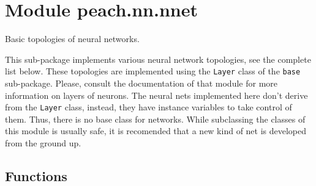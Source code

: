 %
%
%


\section{Module peach.nn.nnet}

    \label{peach:nn:nnet}

Basic topologies of neural networks.

This sub-package implements various neural network topologies, see the complete
list below. These topologies are implemented using the \texttt{Layer} class of the
\texttt{base} sub-package. Please, consult the documentation of that module for more
information on layers of neurons. The neural nets implemented here don't derive
from the \texttt{Layer} class, instead, they have instance variables to take control
of them. Thus, there is no base class for networks. While subclassing the
classes of this module is usually safe, it is recomended that a new kind of
net is developed from the ground up.


  \subsection{Functions}

    \label{peach:nn:nnet:randn}

    \vspace{0.5ex}

